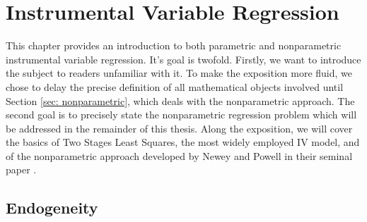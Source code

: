 \chapter{Instrumental Variable Regression}

This chapter provides an introduction to both parametric and nonparametric instrumental variable regression.
It's goal is twofold.
Firstly, we want to introduce the subject to readers unfamiliar with it.
To make the exposition more fluid, we chose to delay the precise definition of all mathematical objects involved until Section \ref{sec: nonparametric}, which deals with the nonparametric approach.
The second goal is to precisely state the nonparametric regression problem which will be addressed in the remainder of this thesis.
Along the exposition, we will cover the basics of Two Stages Least Squares, the most widely employed IV model, and of the nonparametric approach developed by Newey and Powell in their seminal paper \cite{newey2003}.

\section{Endogeneity}

